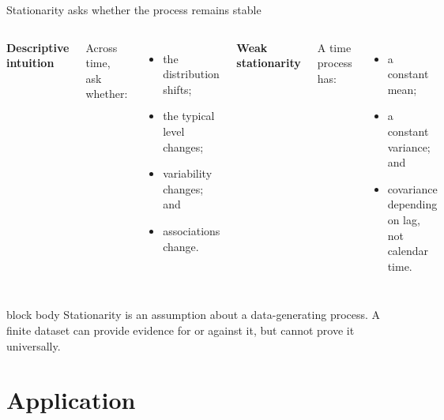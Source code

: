 \documentclass[10pt,aspectratio=169]{beamer}
\begin{document}
\begin{frame}{Stationarity asks whether the process remains stable}

\small

\begin{columns}[T]


\textbf{Descriptive intuition}

Across time, ask whether:

\begin{itemize}
  \item the distribution shifts;
  \item the typical level changes;
  \item variability changes; and
  \item associations change.
\end{itemize}


\textbf{Weak stationarity}

A time process has:

\begin{itemize}
  \item a constant mean;
  \item a constant variance; and
  \item covariance depending on lag, not calendar time.
\end{itemize}

\end{columns}

\vspace{0.30cm}

\begin{beamercolorbox}[rounded=true,sep=8pt]{block body}
Stationarity is an assumption about a data-generating process. A finite dataset can provide evidence for or against it, but cannot prove it universally.
\end{beamercolorbox}

\end{frame}


\section{Application}
\end{document}
